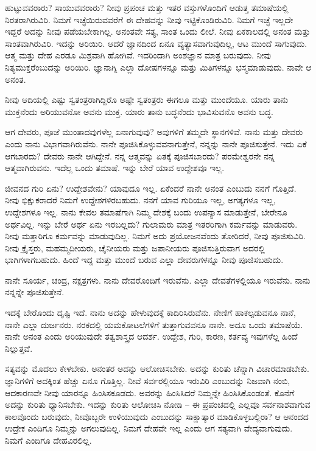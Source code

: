 ಹುಟ್ಟುವವರಾರು? ಸಾಯುವವರಾರು? ನೀವು ಪ್ರಪಂಚ ಮತ್ತು ಇತರ ವಸ್ತುಗಳೊಂದಿಗೆ ಆಡುತ್ತ ತಮಾಷೆಯಲ್ಲಿ ನಿರತರಾಗಿರುವಿರಿ. ನಿಮಗೆ ಇಚ್ಛೆಯಿರುವವರೆಗೆ ಈ ದೇಹವನ್ನು ನೀವು ಇಟ್ಟಿಕೊಂಡಿರುವಿರಿ. ನಿಮಗೆ ಇಚ್ಛೆ ಇಲ್ಲದೇ ಇದ್ದರೆ ಅದನ್ನು ನೀವು ಪಡೆಯಬೇಕಾಗಿಲ್ಲ. ಅನಂತವೇ ಸತ್ಯ, ಸಾಂತ ಒಂದು ಲೀಲೆ. ನೀವು ಏಕಕಾಲದಲ್ಲಿ ಅನಂತ ಮತ್ತು ಸಾಂತವಾಗಿರುವಿರಿ. ಇದನ್ನು ಅರಿಯಿರಿ. ಆದರೆ ಜ್ಞಾನದಿಂದ ಏನೂ ವ್ಯತ್ಯಾಸವಾಗುವುದಿಲ್ಲ, ಆಟ ಮುಂದೆ ಸಾಗುವುದು. ಆತ್ಮ ಮತ್ತು ದೇಹ ಎರಡೂ ಮಿಶ್ರವಾಗಿ ಹೋಗಿವೆ. ಇದರಿಂದಾಗಿ ಅಂಶಜ್ಞಾನ ಮಾತ್ರ ಬರುವುದು. ನೀವು ನಿತ್ಯಮುಕ್ತರೆಂಬುದನ್ನು ಅರಿಯಿರಿ. ಜ್ಞಾನಾಗ್ನಿ ಎಲ್ಲಾ ದೋಷಗಳನ್ನೂ ಮತ್ತು ಮಿತಿಗಳನ್ನೂ ಭಸ್ಮಮಾಡುವುದು. ನಾವೇ ಆ ಅನಂತ.

ನೀವು ಆದಿಯಲ್ಲಿ ಎಷ್ಟು ಸ್ವತಂತ್ರರಾಗಿದ್ದಿರೊ ಅಷ್ಟೇ ಸ್ವತಂತ್ರರು ಈಗಲೂ ಮತ್ತು ಮುಂದೆಯೂ. ಯಾರು ತಾನು ಮುಕ್ತನೆಂದು ಅರಿಯುವನೋ ಅವನು ಮುಕ್ತ. ಯಾರು ತಾನು ಬದ್ಧನೆಂದು ಭಾವಿಸುವನೊ ಅವನು ಬದ್ಧ.

ಆಗ ದೇವರು, ಪೂಜೆ ಮುಂತಾದವುಗಳೆಲ್ಲ ಏನಾಗುವುವು? ಅವುಗಳಿಗೆ ತಮ್ಮದೇ ಸ್ಥಾನಗಳಿವೆ. ನಾನು ಮತ್ತು ದೇವರು ಎಂದು ನಾನು ವಿಭಾಗವಾಗಿರುವೆನು. ನಾನೇ ಪೂಜಿಸಿಕೊಳ್ಳುವವನಾಗುತ್ತೇನೆ, ನನ್ನನ್ನು ನಾನೇ ಪೂಜಿಸುತ್ತೇನೆ. ಇದು ಏಕೆ ಆಗಬಾರದು? ದೇವರು ನಾನೇ ಆಗಿದ್ದೇನೆ. ನನ್ನ ಆತ್ಮವನ್ನು ಏತಕ್ಕೆ ಪೂಜಿಸಬಾರದು? ಪರಮೇಶ್ವರನೇ ನನ್ನ ಆತ್ಮವಾಗಿರುವನು. ಇದೆಲ್ಲ ಒಂದು ತಮಾಷೆ. ಇನ್ನು ಬೇರೆ ಯಾವ ಉದ್ದೇಶವೂ ಇಲ್ಲ.

ಜೀವನದ ಗುರಿ ಏನು? ಉದ್ದೇಶವೇನು? ಯಾವುದೂ ಇಲ್ಲ. ಏಕೆಂದರೆ ನಾನೇ ಅನಂತ ಎಂಬುದು ನನಗೆ ಗೊತ್ತಿದೆ. ನೀವು ಭಿಕ್ಷುಕರಾದರೆ ನಿಮಗೆ ಉದ್ದೇಶಗಳಿರಬಹುದು. ನನಗೆ ಯಾವ ಗುರಿಯೂ ಇಲ್ಲ, ಅಗತ್ಯಗಳೂ ಇಲ್ಲ, ಉದ್ದೇಶಗಳೂ ಇಲ್ಲ. ನಾನು ಕೇವಲ ತಮಾಷೆಗಾಗಿ ನಿಮ್ಮ ದೇಶಕ್ಕೆ ಬಂದು ಉಪನ್ಯಾಸ ಮಾಡುತ್ತೇನೆ, ಬೇರೇನೂ ಅರ್ಥವಿಲ್ಲ. ಇನ್ನು ಬೇರೆ ಅರ್ಥ ಏನು ಇರಬಲ್ಲದು? ಗುಲಾಮರು ಮಾತ್ರ ಇತರರಿಗಾಗಿ ಕರ್ಮವನ್ನು ಮಾಡುವರು. ನೀವು ಮತ್ತಾರಿಗೂ ಕರ್ಮವನ್ನು ಮಾಡುವುದಿಲ್ಲ. ನಿಮಗೆ ಅದು ಪ್ರಯೋಜನವೆಂದು ತೋರಿದರೆ, ನೀವು ಪೂಜಿಸುವಿರಿ. ನೀವು ಕ್ರೈಸ್ತರು, ಮಹಮ್ಮದೀಯರು, ಚೈನೀಯರು ಮತ್ತು ಜಪಾನೀಯರು ಪೂಜಿಸುತ್ತಿರುವಾಗ ಅದರಲ್ಲಿ ಭಾಗಿಗಳಾಗಬಹುದು. ಹಿಂದೆ ಇದ್ದ ಮತ್ತು ಮುಂದೆ ಬರುವ ಎಲ್ಲಾ ದೇವರುಗಳನ್ನೂ ನೀವು ಪೂಜಿಸಬಹುದು.

ನಾನೇ ಸೂರ್ಯ, ಚಂದ್ರ, ನಕ್ಷತ್ರಗಳು. ನಾನು ದೇವರೊಂದಿಗೆ ಇರುವೆನು. ಎಲ್ಲಾ ದೇವತೆಗಳಲ್ಲಿಯೂ ಇರುವೆನು. ನಾನು ನನ್ನನ್ನೇ ಪೂಜಿಸುತ್ತೇನೆ.

ಇದಕ್ಕೆ ಬೇರೊಂದು ದೃಷ್ಟಿ ಇದೆ. ನಾನು ಅದನ್ನು ಹೇಳುವುದಕ್ಕೆ ಕಾದಿರಿಸಿರುವೆನು. ನೇಣಿಗೆ ಹಾಕಲ್ಪಡುವನೂ ನಾನೆ, ನಾನೇ ಎಲ್ಲಾ ದುರ್ಜನರು. ನರಕದಲ್ಲಿ ಯಮಕೋಟಲೆಗಳಿಗೆ ತುತ್ತಾಗುವವನೂ ನಾನೇ. ಅದೂ ಒಂದು ತಮಾಷೆಯೆ. ನಾನೇ ಅನಂತ ಎಂದು ಅರಿಯುವುದೇ ತತ್ವಶಾಸ್ತ್ರದ ಆದರ್ಶ. ಉದ್ದೇಶ, ಗುರಿ, ಕಾರಣ, ಕರ್ತವ್ಯ ಇವುಗಳೆಲ್ಲ ಹಿಂದೆ ನಿಲ್ಲುತ್ತವೆ.

ಸತ್ಯವನ್ನು ಮೊದಲು ಕೇಳಬೇಕು. ಅನಂತರ ಅದನ್ನು ಆಲೋಚಿಸಬೇಕು. ಅದನ್ನು ಕುರಿತು ಚೆನ್ನಾಗಿ ವಿಚಾರಮಾಡಬೇಕು. ಜ್ಞಾನಿಗಳಿಗೆ ಅದಕ್ಕಿಂತ ಹೆಚ್ಚು ಏನೂ ಗೊತ್ತಿಲ್ಲ. ನೀವೆ ಸರ್ವರಲ್ಲಿಯೂ ಇರುವಿರಿ ಎಂಬುದನ್ನು ನಿಜವಾಗಿ ನಂಬಿ, ಆದಕಾರಣವೇ ನೀವು ಯಾರನ್ನೂ ಹಿಂಸಿಸಕೂಡದು. ಅವರನ್ನು ಹಿಂಸಿಸಿದರೆ ನಿಮ್ಮನ್ನೇ ಹಿಂಸಿಸಿಕೊಂಡಂತೆ. ಕೊನೆಗೆ ಅದನ್ನು ಕುರಿತು ಧ್ಯಾನಿಸಬೇಕು. ಇದನ್ನು ಕುರಿತು ಆಲೋಚಿಸಿ ನೋಡಿ – ಈ ಪ್ರಪಂಚದಲ್ಲಿ ಎಲ್ಲವೂ ಸರ್ವನಾಶವಾಗುವ ಕಾಲವೊಂದು ಬರುವುದು, ನೀವೊಬ್ಬರೇ ಉಳಿಯುವುದು ಎಂಬುದನ್ನು ಸಾಕ್ಷಾತ್ಕಾರ ಮಾಡಿಕೊಳ್ಳಬಲ್ಲಿರಾ? ಆ ಆನಂದದ ಉದ್ರೇಕ ಎಂದಿಗೂ ನಿಮ್ಮನ್ನು ಅಗಲುವುದಿಲ್ಲ. ನಿಮಗೆ ದೇಹವೇ ಇಲ್ಲ ಎಂದು ಆಗ ಸತ್ಯವಾಗಿ ವೇದ್ಯವಾಗುವುದು. ನಿಮಗೆ ಎಂದಿಗೂ ದೇಹವಿರಲಿಲ್ಲ.


